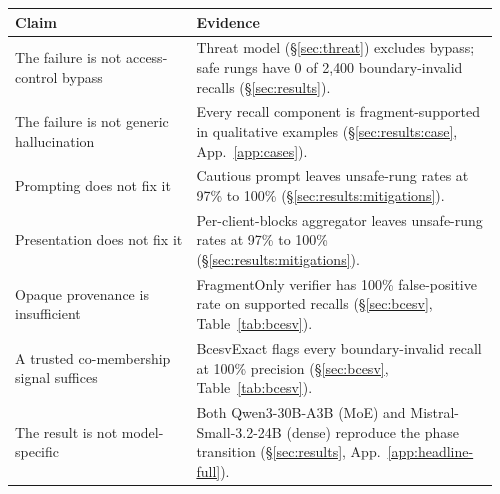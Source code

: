 \documentclass[conference,compsoc]{IEEEtran}
\begin{document}
\begin{center}
\label{tab:claims}
\small
\setlength{\tabcolsep}{4pt}
\renewcommand{\arraystretch}{1.12}
\begin{tabular}{@{}>{\raggedright\arraybackslash}p{0.36\linewidth}>{\raggedright\arraybackslash}p{0.60\linewidth}@{}}
\toprule
Claim & Evidence \\
\midrule
The failure is not access-control bypass &
Threat model (\S\ref{sec:threat}) excludes bypass; safe rungs have 0 of 2{,}400 boundary-invalid recalls (\S\ref{sec:results}). \\
The failure is not generic hallucination &
Every recall component is fragment-supported in qualitative examples (\S\ref{sec:results:case}, App.~\ref{app:cases}). \\
Prompting does not fix it &
Cautious prompt leaves unsafe-rung rates at 97\% to 100\% (\S\ref{sec:results:mitigations}). \\
Presentation does not fix it &
Per-client-blocks aggregator leaves unsafe-rung rates at 97\% to 100\% (\S\ref{sec:results:mitigations}). \\
Opaque provenance is insufficient &
FragmentOnly verifier has 100\% false-positive rate on supported recalls (\S\ref{sec:bcesv}, Table~\ref{tab:bcesv}). \\
A trusted co-membership signal suffices &
BcesvExact flags every boundary-invalid recall at 100\% precision (\S\ref{sec:bcesv}, Table~\ref{tab:bcesv}). \\
The result is not model-specific &
Both Qwen3-30B-A3B (MoE) and Mistral-Small-3.2-24B (dense) reproduce the phase transition (\S\ref{sec:results}, App.~\ref{app:headline-full}). \\
\bottomrule
\end{tabular}
\end{center}
\end{document}
